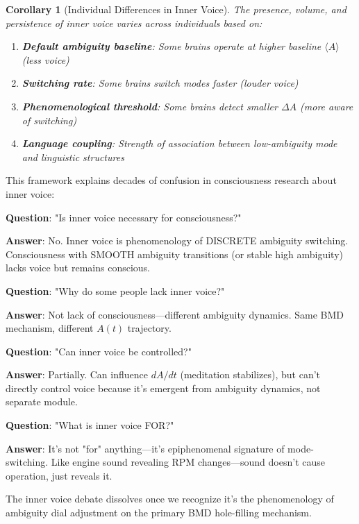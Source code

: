 \documentclass[11pt,a4paper]{article}
\newtheorem{corollary}[theorem]{Corollary}
\begin{document}
\begin{corollary}[Individual Differences in Inner Voice]
\label{cor:voice_differences}
The presence, volume, and persistence of inner voice varies across individuals based on:
\begin{enumerate}
\item \textbf{Default ambiguity baseline}: Some brains operate at higher baseline $\langle A \rangle$ (less voice)
\item \textbf{Switching rate}: Some brains switch modes faster (louder voice)
\item \textbf{Phenomenological threshold}: Some brains detect smaller $\Delta A$ (more aware of switching)
\item \textbf{Language coupling}: Strength of association between low-ambiguity mode and linguistic structures
\end{enumerate}
\end{corollary}

\begin{remark}
This framework explains decades of confusion in consciousness research about inner voice:

\textbf{Question}: "Is inner voice necessary for consciousness?"

\textbf{Answer}: No. Inner voice is phenomenology of DISCRETE ambiguity switching. Consciousness with SMOOTH ambiguity transitions (or stable high ambiguity) lacks voice but remains conscious.

\textbf{Question}: "Why do some people lack inner voice?"

\textbf{Answer}: Not lack of consciousness—different ambiguity dynamics. Same BMD mechanism, different $A(t)$ trajectory.

\textbf{Question}: "Can inner voice be controlled?"

\textbf{Answer}: Partially. Can influence $dA/dt$ (meditation stabilizes), but can't directly control voice because it's emergent from ambiguity dynamics, not separate module.

\textbf{Question}: "What is inner voice FOR?"

\textbf{Answer}: It's not "for" anything—it's epiphenomenal signature of mode-switching. Like engine sound revealing RPM changes—sound doesn't cause operation, just reveals it.

The inner voice debate dissolves once we recognize it's the phenomenology of ambiguity dial adjustment on the primary BMD hole-filling mechanism.
\end{remark}
\end{document}
